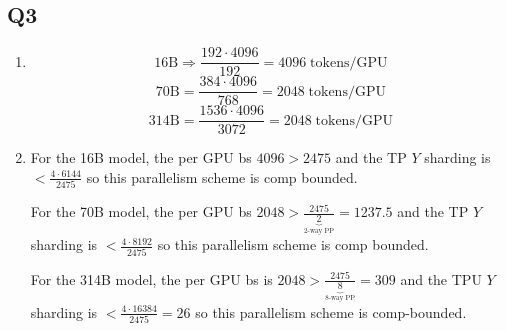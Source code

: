 \documentclass[11pt]{article}
\begin{document}
\subsection*{Q3}

\begin{enumerate}[label=(\roman*)]
    \item \[
    16\text{B} \Rightarrow \frac{192 \cdot 4096}{192} = 4096 \;\text{tokens/GPU}
    \]
    \[
    70\text{B} = \frac{384 \cdot 4096}{768} = 2048 \;\text{tokens/GPU}
    \]
    \[
    314\text{B} = \frac{1536 \cdot 4096}{3072} = 2048 \;\text{tokens/GPU}
    \]

    \item For the 16B model, the per GPU bs $4096 > 2475$ and the TP $Y$ sharding is $< \frac{4 \cdot 6144}{2475}$ so this parallelism scheme is comp bounded.

    For the 70B model, the per GPU bs $2048 > \frac{2475}{\underbrace{2}_{\text{2-way PP}}} = 1237.5$ and the TP $Y$ sharding is $< \frac{4 \cdot 8192}{2475}$ so this parallelism scheme is comp bounded.

    For the 314B model, the per GPU bs is $2048 > \frac{2475}{\underbrace{8}_{\text{8-way PP}}} = 309$ and the TPU $Y$ sharding is $< \frac{4 \cdot 16384}{2475} = 26$ so this parallelism scheme is comp-bounded.
\end{enumerate}
\end{document}
